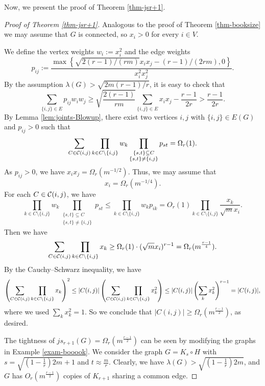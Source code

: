 \documentclass[11pt,a4paper]{article}
\theoremstyle{definition}
\theoremstyle{remark}
\newcommand{\C}[1]{{\protect\mathcal{#1}}}
\newcommand*{\abs}[1]{\lvert#1\rvert}
\begin{document}
Now, we present the proof of Theorem \ref{thm-jsr+1}. 


\begin{proof}[Proof of Theorem \ref{thm-jsr+1}] 
Analogous to the proof of Theorem \ref{thm-booksize} we may assume that $G$ is connected, so $x_i > 0$ for every $i \in V$. 

We define the vertex weights $w_i := x_i^2$ and the edge weights 
$$p_{ij} := \frac{\max\left\{ \sqrt{2(r - 1)/(rm)} x_i x_j - (r - 1)/(2 r m), 0\right\}}{x_i^2 x_j^2}.$$
By the assumption $\lambda (G) > \sqrt{2m(r-1)/r } $, it is easy to check that
$$\sum_{\{i, j\} \in E} p_{ij} w_i w_j 
\ge \sqrt{\frac{2(r-1)}{rm}} \sum_{\{i,j\}\in E} x_ix_j 
- \frac{r-1}{2r} 
> \frac{r - 1}{2r}.$$
By Lemma \ref{lem:joints-Blowup}, there exist two vertices $i, j$ with $\{i,j\} \in E(G)$ and $p_{ij} > 0$ such that
$$\sum_{C \in \C C(i, j)} \prod_{k \in C\setminus \{i,j\}} w_{k} 
\prod_{\substack{\{s,t\}\subseteq C \\
      \{s,t\} \neq \{i,j\} }} p_{st} =  \Omega_r(1).$$
As $p_{ij} > 0$,  we have 
$x_ix_j = \Omega_r(m^{-1/2})$. Thus, 
 we may assume that 
\[ x_i = \Omega_r( m^{-1/4}). \] 
 For each $C \in \C C(i, j)$, we have 
$$\prod_{k \in C\setminus \{i,j\}} w_{k} 
\prod_{\substack{\{s,t\}\subseteq C \\
      \{s,t\} \neq \{i,j\} }} p_{st} \leq 
      \prod_{k \in C\setminus \{i,j\}} w_{k}p_{ik} = O_r(1) 
      \prod_{k \in C\setminus \{i,j\}} \frac{x_k}{\sqrt{m}x_i}.$$
Then we have
$$\sum_{C \in \C C(i, j)} \prod_{k \in C\setminus \{i,j\}} 
x_k \ge \Omega_r(1) \cdot (\sqrt{m} x_i)^{r-1} 
= \Omega_r(m^{\frac{r-1}{4}}).$$
By the Cauchy--Schwarz inequality, we have
$$\left(\sum_{C \in \C C(i, j)} \prod_{k \in C\setminus \{i,j\}} x_k\right)^2 \leq 
\abs{C(i, j)} \left(\sum_{C \in \C C(i, j)} 
\prod_{k \in C\setminus \{i,j\}} x_k^2\right)\le \abs{C(i, j)}\left(\sum_{k} x_k^2\right)^{r-1} = \abs{C(i, j)},$$
where we used $\sum_{k} x_k^2 =1$. 
So we conclude that
$\abs{C(i, j)} \ge \Omega_r (m^{\frac{r - 1}{2}})$, 
as desired. 

The tightness of $js_{r+1}(G)=\Omega_r(m^{\frac{r-1}{2}})$ can be seen by modifying the graphs in Example \ref{exam-booook}. We
consider the graph $G=K_{s}\circ H$ with $s=\sqrt{(1-\frac{1}{r})2m} +1$ and $t\approx \frac{m}{r}$. Clearly, we have 
$\lambda (G)> \sqrt{(1- \frac{1}{r})2m}$, and $G$ has $O_r(m^{\frac{r-1}{2}})$ copies of $K_{r+1}$ sharing a common edge. 
\end{proof}
\end{document}
